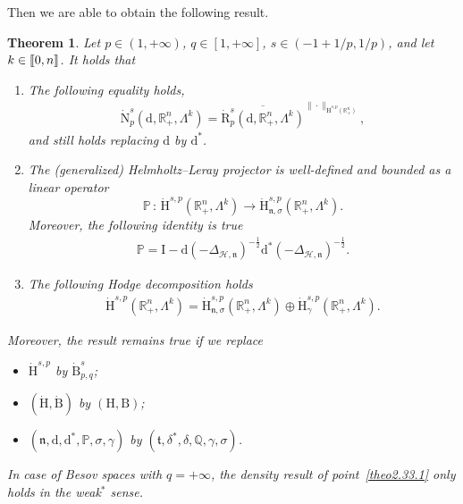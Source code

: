 \documentclass[10pt]{amsart}
\newtheorem{theo}{Theorem}[section]
\theoremstyle{definition}\newtheorem{defi}[theo]{Definition}\newtheorem{rema}[theo]{Remark}\newtheorem{exam}[theo]{Example}\newtheorem{exem}[theo]{Example}\newtheorem{nota}[theo]{Notation}
\newcommand{\bbP}{\mathbb{P}}
\newcommand{\bbR}{\mathbb{R}}
\newcommand{\bbQ}{\mathbb{Q}}
\newcommand{\rmH}{\mathrm{H}}%
\newcommand{\rmB}{\mathrm{B}}
\newcommand{\rmd}{\mathrm{d}}
\newcommand{\rmR}{\mathrm{R}}
\newcommand{\rmN}{\mathrm{N}}
\newcommand{\rmI}{\mathrm{I}}
\newcommand{\clH}{\mathcal{H}}
\newcommand{\fkn}{\mathfrak{n}}
\newcommand{\fkt}{\mathfrak{t}}
\newcommand{\llbracket}{\mathopen{[\mkern -2.7mu[}}
\newcommand{\rrbracket}{\mathclose{]\mkern -2.7mu]}}
\newcommand{\llb}{\llbracket}
\newcommand{\rrb}{\rrbracket}
\newcommand*{\romanenumi}{\renewcommand*{\theenumi}{\roman{enumi}}}
\begin{document}
Then we are able to obtain the following result.


\begin{theo}\label{thm:HodgeDecompRn+}
Let $p\in(1,+\infty)$, $q\in[1,+\infty]$, $s\in(-1+1/p,1/p)$, and let $k\in\llb 0,n\rrb$. It holds that
\begin{enumerate}\romanenumi
\item\label{theo2.33.1} The following equality holds,
\begin{align*}
\dot{\rmN}^{s}_{p}\left(\rmd,\bbR^n_+,\Lambda^k\right) = \overline{\dot{\rmR}^{s}_{p}\left(\rmd,\bbR^n_+,\Lambda^k\right)}^{\|\cdot\|_{\dot{\rmH}^{s,p}\left(\bbR^n_+\right)}},
\end{align*}
and still holds replacing $\rmd$ by $\rmd^\ast$.

\item\label{theo2.33.2} The (generalized) Helmholtz--Leray projector is well-defined and bounded as a linear operator
\[
\bbP\,:\, \dot{\rmH}^{s,p}\left(\bbR^n_+,\Lambda^k\right)\longrightarrow \dot{\rmH}^{s,p}_{{\fkn},\sigma}\left(\bbR^n_+,\Lambda^k\right).
\]
Moreover, the following identity is true
\begin{align*}
\bbP = \rmI  - \rmd\left(-\Delta_{\clH,\fkn}\right)^{-\frac{1}{2}}\rmd^\ast\left(-\Delta_{\clH,\fkn}\right)^{-\frac{1}{2}} .
\end{align*}

\item\label{theo2.33.3} The following Hodge decomposition holds
\begin{align*}
\dot{\rmH}^{s,p}\left(\bbR^n_+,\Lambda^k\right) = \dot{\rmH}^{s,p}_{{\fkn},\sigma}\left(\bbR^n_+,\Lambda^k\right) \oplus \dot{\rmH}^{s,p}_{\gamma}\left(\bbR^n_+,\Lambda^k\right).
\end{align*}
\end{enumerate}
Moreover, the result remains true if we replace
\begin{itemize}
\item $\dot{\rmH}^{s,p}$ by $\dot{\rmB}^{s}_{p,q}$;
\item $(\dot{\rmH},\dot{\rmB})$ by $({\rmH},{\rmB})$;
\item $(\fkn,\rmd,\rmd^\ast,\bbP,\sigma,\gamma)$ by $(\fkt,\delta^\ast,\delta,\bbQ,\gamma,\sigma)$.
\end{itemize}
In case of Besov spaces with $q=+\infty$, the density result of point~\eqref{theo2.33.1} only holds in the weak${}^\ast$ sense.
\end{theo}
\end{document}
